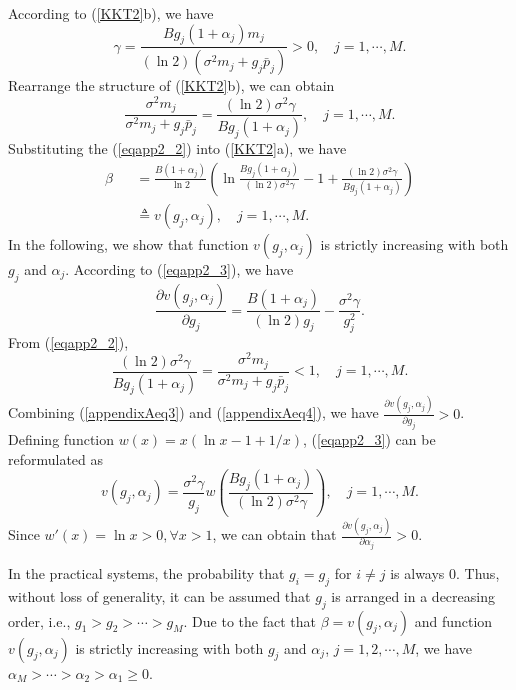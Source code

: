 \documentclass[journal]{IEEEtran}
\begin{document}
According to (\ref{KKT2}b), we have
\begin{equation}\label{eqapp2_1}
\gamma=\frac{B{ g_j(1+\alpha_j)m_j}}{(\ln2){(\sigma^2 m_j+g_j\bar p_j)}}>0,\quad j=1,\cdots, M.
\end{equation}
Rearrange the structure of (\ref{KKT2}b), we can obtain
\begin{equation}\label{eqapp2_2}
\frac{\sigma^2 m_j}{ {\sigma^2 m_j+g_j\bar p_j}}=\frac{(\ln2){\sigma^2\gamma}}{B{ g_j(1+\alpha_j)}}, \quad j=1,\cdots, M.
\end{equation}
Substituting the (\ref{eqapp2_2}) into (\ref{KKT2}a), we have
\begin{eqnarray}\label{eqapp2_3}
\beta&&\!\!\!\!\!\!\!\!\!\!=
{\frac{B(1+\alpha_j)}{\ln2}}  \left(\ln\frac{{B} g_j(1+\alpha_j)}{{(\ln2)}\sigma^2\gamma}
-1+\frac{{(\ln2)}\sigma^2\gamma}{{B} g_j(1+\alpha_j)}\right)
\nonumber\\
&&\!\!\!\!\!\!\!\!\!\!
\triangleq v (g_j, \alpha_j), \quad j=1,\cdots, M.
\end{eqnarray}
In the following, we show that function $v (g_j, \alpha_j)$ is strictly increasing with both $g_j$ and $\alpha_j$.
According to (\ref{eqapp2_3}), we have
\begin{equation}\label{appendixAeq3}
\frac{\partial v (g_j, \alpha_j)} {\partial g_j}= \frac{B(1+\alpha_j)}{(\ln2)g_j} - \frac{\sigma^2 \gamma} {g_j^2 }.
\end{equation}
From (\ref{eqapp2_2}),
\begin{equation}\label{appendixAeq4}
\frac{(\ln2){\sigma^2\gamma}}{B{ g_j(1+\alpha_j)}}=\frac{\sigma^2 m_j}{ {\sigma^2 m_j+g_j\bar p_j}}<1, \quad j=1,\cdots, M.
\end{equation}
Combining (\ref{appendixAeq3}) and (\ref{appendixAeq4}),
we have $\frac{\partial v (g_j, \alpha_j)} {\partial g_j}>0$.
Defining function $w(x)=x(\ln x -1 +1/x)$, (\ref{eqapp2_3}) can be reformulated as
\begin{equation}\label{appendixAeq2}
v (g_j, \alpha_j)=\frac{\sigma^2 \gamma}{g_j}w\left(
\frac{B{ g_j(1+\alpha_j)}}{(\ln2){\sigma^2\gamma}} \right), \quad j=1,\cdots, M.
\end{equation}
Since $w'(x)=\ln x >0, \forall x>1$,
we can obtain that $\frac{\partial v (g_j, \alpha_j)} {\partial \alpha_j}>0$.

In the practical systems,  the probability that $g_i = g_j$ for $i \neq j$ is always 0.
Thus, without loss of generality, it can be assumed that $g_j$ is arranged in a decreasing order, i.e.,
$g_1 > g_2 > \cdots > g_M$.
Due to the fact that $\beta=v(g_j, \alpha_j)$ and function $v(g_j, \alpha_j)$ is strictly increasing with both $g_j$ and $\alpha_j$, $j=1, 2, \cdots, M$, we have $\alpha_M>\cdots>\alpha_2>\alpha_1\geq0$.
\end{document}
